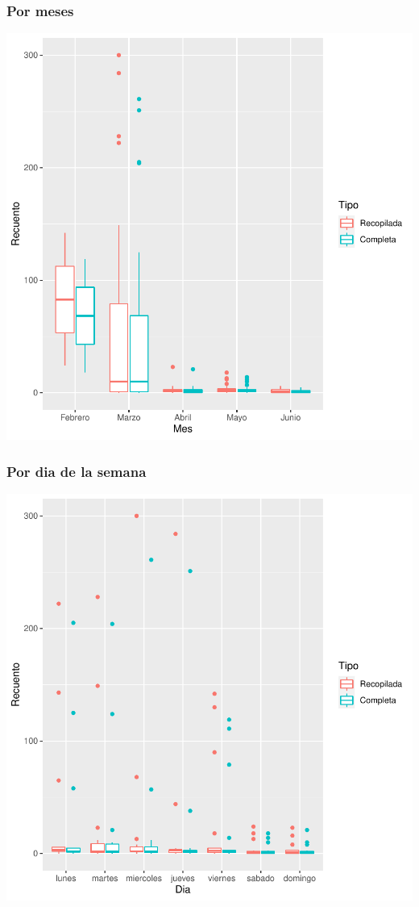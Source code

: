 \documentclass{article}
\begin{document}
\subsubsection{Por meses}

\includegraphics{seguimento2-012}

\subsubsection{Por dia de la semana}

\includegraphics{seguimento2-013}
\end{document}
